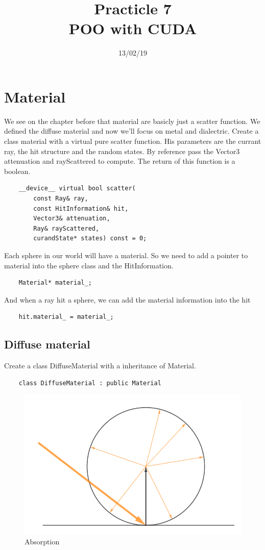 \documentclass{article}
\begin{document}
\title{Practicle 7\\POO with CUDA}
\date{13/02/19}
\maketitle

\begin{abstract}
	
\end{abstract}

\section{Material}
We see on the chapter before that material are basicly just a scatter function. We defined the diffuse material and now we'll focus on metal and dialectric. Create a class material with a virtual pure scatter function. His parameters are the currant ray, the hit structure and the random states. By reference pass the Vector3 attenuation and rayScattered to compute. The return of this function is a boolean.
\begin{lstlisting}
	__device__ virtual bool scatter(
		const Ray& ray,
		const HitInformation& hit,
		Vector3& attenuation,
		Ray& rayScattered,
		curandState* states) const = 0;
\end{lstlisting}

Each sphere in our world will have a material. So we need to add a pointer to material into the sphere class and the HitInformation.
\begin{lstlisting}
	Material* material_;
\end{lstlisting}

And when a ray hit a sphere, we can add the material information into the hit
\begin{lstlisting}
	hit.material_ = material_;
\end{lstlisting}

\subsection{Diffuse material}
Create a class DiffuseMaterial with a inheritance of Material.
\begin{lstlisting}
	class DiffuseMaterial : public Material
\end{lstlisting}

\begin{figure}[h]
	\centering
	\includegraphics[scale=0.47]{figures/diffuse.png}
	\caption{Absorption}
\end{figure}
\end{document}
